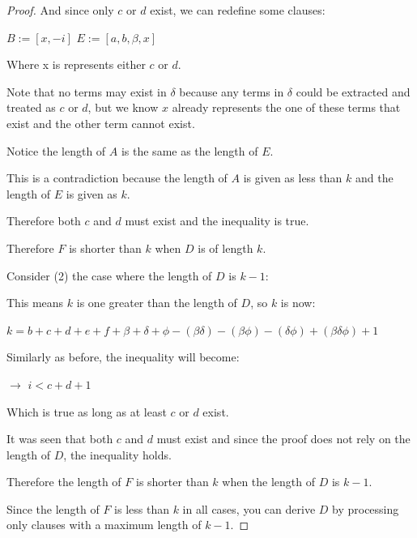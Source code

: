 \documentclass[manuscript]{acmart}
\begin{document}
\begin{proof}
        And since only $c$ or $d$ exist, we can redefine some clauses:

        $B := [x, -i]$
        $E := [a, b, \beta, x]$

        Where x is represents either $c$ or $d$.

        Note that no terms may exist in $\delta$ because any terms in $\delta$ could be extracted and treated as $c$ or $d$, but we know $x$ already represents the one of these terms that exist and the other term cannot exist.

        Notice the length of $A$ is the same as the length of $E$.

        This is a contradiction because the length of $A$ is given as less than $k$ and the length of $E$ is given as $k$.

        Therefore both $c$ and $d$ must exist and the inequality is true.

        Therefore $F$ is shorter than $k$ when $D$ is of length $k$.
    
        Consider (2) the case where the length of $D$ is $k - 1$:

        This means $k$ is one greater than the length of $D$, so $k$ is now:

        $k = b + c + d + e + f + \beta + \delta + \phi - (\beta \delta) - 
        (\beta \phi) - (\delta \phi) + (\beta \delta \phi) + 1$

        Similarly as before, the inequality will become:

        $\rightarrow$ $i < c + d + 1$

        Which is true as long as at least $c$ or $d$ exist.

        It was seen that both $c$ and $d$ must exist and since the proof does not rely on the length of $D$, the inequality holds.

        Therefore the length of $F$ is shorter than $k$ when the length of $D$ is $k - 1$.

        Since the length of $F$ is less than $k$ in all cases, you can derive
        $D$ by processing only clauses with a maximum length of $k-1$.
    \end{proof}
\end{document}
